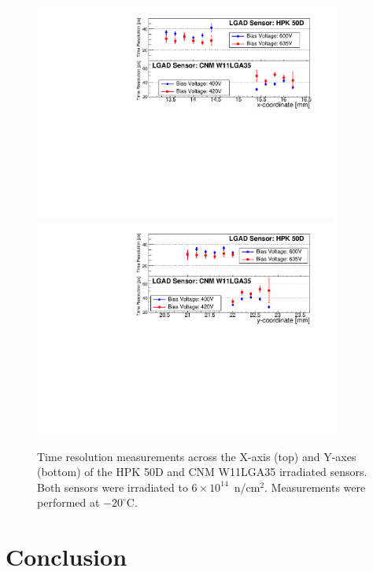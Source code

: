 \documentclass[preprint,1p]{elsarticle}
\begin{document}
\begin{figure}[htbp] 
\centering
\includegraphics[width=0.90\textwidth]{figs/USCSBoard_HPK50DIrradiated-CNMW11LGA35_Run936-961/IrradiatedSensorStudy_TimeResolution_vs_X.pdf} 
\includegraphics[width=0.90\textwidth]{figs/USCSBoard_HPK50DIrradiated-CNMW11LGA35_Run936-961/IrradiatedSensorStudy_TimeResolution_vs_Y.pdf} 
\caption{Time resolution measurements across the X-axis (top) and Y-axes (bottom) of the HPK 50D and CNM W11LGA35 irradiated sensors. Both sensors were irradiated to $6\times 10^{14}$~n/cm$^2$. Measurements were performed at $-20^{\circ}$C.} 
\label{fig:IrradiatedSensorStudy_TimeResolution} 
\end{figure} 

 

\section{Conclusion}
\label{sec:conclusion} 
\end{document}
